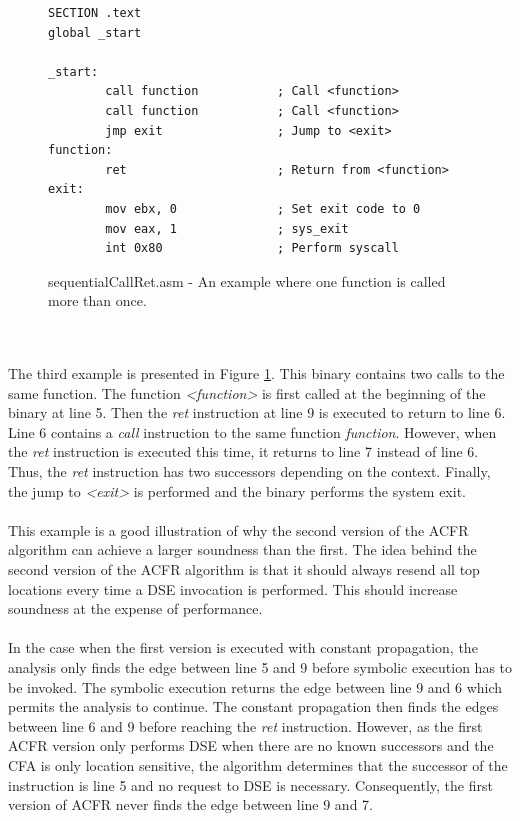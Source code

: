 \documentclass{kththesis}
\renewcommand{\it}[1]{\textit{#1}}
\begin{document}
\begin{figure}[!t]
    \centering
\begin{tcolorbox}
\begin{verbatim}
SECTION .text
global _start

_start:
        call function           ; Call <function>
        call function           ; Call <function>
        jmp exit                ; Jump to <exit>
function:
        ret                     ; Return from <function>
exit:
        mov ebx, 0              ; Set exit code to 0
        mov eax, 1              ; sys_exit
        int 0x80                ; Perform syscall
\end{verbatim}
\end{tcolorbox}
\caption{sequentialCallRet.asm - An example where one function is called more than once.}
    \label{fig:sequentialCallRet}
\end{figure}
\\ \\
The third example is presented in Figure \ref{fig:sequentialCallRet}. This binary contains two calls to the same function. The function \it{<function>} is first called at the beginning of the binary at line 5. Then the \it{ret} instruction at line 9 is executed to return to line 6. Line 6 contains a \it{call} instruction to the same function \it{function}. However, when the \it{ret} instruction is executed this time, it returns to line 7 instead of line 6. Thus, the \it{ret} instruction has two successors depending on the context. Finally, the jump to \it{<exit>} is performed and the binary performs the system exit.
\\ \\
This example is a good illustration of why the second version of the ACFR algorithm can achieve a larger soundness than the first. The idea behind the second version of the ACFR algorithm is that it should always resend all top locations every time a DSE invocation is performed. This should increase soundness at the expense of performance.
\\ \\
In the case when the first version is executed with constant propagation, the analysis only finds the edge between line 5 and 9 before symbolic execution has to be invoked. The symbolic execution returns the edge between line 9 and 6 which permits the analysis to continue. The constant propagation then finds the edges between line 6 and 9 before reaching the \it{ret} instruction. However, as the first ACFR version only performs DSE when there are no known successors and the CFA is only location sensitive, the algorithm determines that the successor of the instruction is line 5 and no request to DSE is necessary. Consequently, the first version of ACFR never finds the edge between line 9 and 7.
\end{document}
